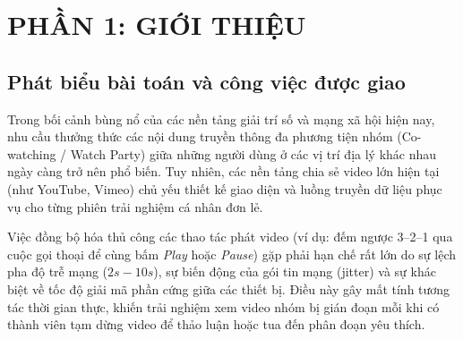 \documentclass[12pt,a4paper]{extarticle}
\begin{document}
\section{PHẦN 1: GIỚI THIỆU}

\subsection{Phát biểu bài toán và công việc được giao}

Trong bối cảnh bùng nổ của các nền tảng giải trí số và mạng xã hội hiện nay, nhu cầu thưởng thức các nội dung truyền thông đa phương tiện nhóm (Co-watching / Watch Party) giữa những người dùng ở các vị trí địa lý khác nhau ngày càng trở nên phổ biến. Tuy nhiên, các nền tảng chia sẻ video lớn hiện tại (như YouTube, Vimeo) chủ yếu thiết kế giao diện và luồng truyền dữ liệu phục vụ cho từng phiên trải nghiệm cá nhân đơn lẻ. 

Việc đồng bộ hóa thủ công các thao tác phát video (ví dụ: đếm ngược 3--2--1 qua cuộc gọi thoại để cùng bấm \textit{Play} hoặc \textit{Pause}) gặp phải hạn chế rất lớn do sự lệch pha độ trễ mạng ($2s - 10s$), sự biến động của gói tin mạng (jitter) và sự khác biệt về tốc độ giải mã phần cứng giữa các thiết bị. Điều này gây mất tính tương tác thời gian thực, khiến trải nghiệm xem video nhóm bị gián đoạn mỗi khi có thành viên tạm dừng video để thảo luận hoặc tua đến phân đoạn yêu thích.
\end{document}
